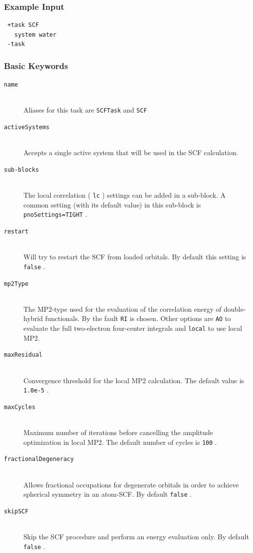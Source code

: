 \documentclass[bibliography=totocnumbered,a4paper,10pt,oneside]{scrbook}
\newcommand{\ttt}[1]{%
  \begingroup\setlength{\fboxsep}{1pt}%
  \colorbox{serenity-green!30}{\texttt{\hspace*{2pt}\vphantom{(g}#1\hspace*{2pt}}}%
  \endgroup
}
\begin{document}
\subsubsection{Example Input}
\begin{lstlisting}
 +task SCF
   system water
 -task
\end{lstlisting}
\subsubsection{Basic Keywords}
\begin{description}
	\item[\texttt{name}]\hfill \\
	Aliases for this task are \ttt{SCFTask} and \ttt{SCF}
	\item[\texttt{activeSystems}]\hfill \\
	Accepts a single active system that will be used in the SCF calculation.
	\item[\texttt{sub-blocks}]\hfill \\
	The local correlation (\ttt{lc}) settings can be added in a sub-block. A common setting (with its default value) in this sub-block is \ttt{pnoSettings=TIGHT}.	
	\item[\texttt{restart}]\hfill \\
	Will try to restart the SCF from loaded orbitals. By default this setting is \ttt{false}.
	\item[\texttt{mp2Type}]\hfill \\
	The MP2-type used for the evaluation of the correlation energy of double-hybrid functionals. By the fault \ttt{RI} is chosen. Other options are \ttt{AO} to evaluate the full two-electron four-center integrals and \ttt{local} to use local MP2.
	\item[\texttt{maxResidual}]\hfill \\
	Convergence threshold for the local MP2 calculation. The default value is \ttt{1.0e-5}.
	\item[\texttt{maxCycles}]\hfill \\
	Maximum number of iterations before cancelling the amplitude optimization in local MP2. The default number of cycles is \ttt{100}.
	\item[\texttt{fractionalDegeneracy}]\hfill \\
	Allows fractional occupations for degenerate orbitals in order to achieve spherical symmetry in an atom-SCF. By default \ttt{false}.
	\item[\texttt{skipSCF}]\hfill \\
	Skip the SCF procedure and perform an energy evaluation only. By default \ttt{false}.
\end{description}
\end{document}
